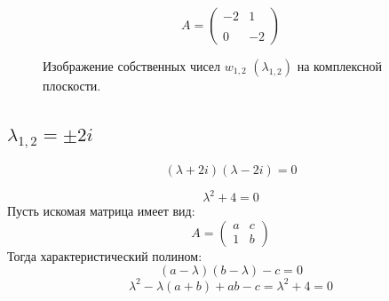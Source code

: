 \documentclass[a5paper, 10pt]{article}
\theoremstyle{definition}
\theoremstyle{plain}
\theoremstyle{remark}
\begin{document}
\begin{equation}
A =
\begin{pmatrix}
 -2 &  1\\
\\
0 &  -2
\end{pmatrix}
\end{equation}
\begin{figure}[h!]
\caption{Изображение собственных чисел $w_{1, 2} \, \, \left( \lambda_{1, 2} \right)$ на комплексной плоскости.}
\end{figure}


\subsection{$\lambda_{1, 2} = \pm 2i$}

\begin{equation}
\left( \lambda +  2i \right)\left( \lambda - 2i \right)=0
\end{equation}

\begin{equation}
\lambda^2 +  4 =0
\end{equation}
Пусть искомая матрица имеет вид:
\begin{equation}
A =
\begin{pmatrix}
a & c \\
1 & b
\end{pmatrix}
\end{equation}
Тогда характеристический полином:
\begin{equation}
\left( a - \lambda \right) \left( b - \lambda \right) - c = 0
\end{equation}
\begin{equation}
\lambda^ 2 - \lambda (a + b ) + ab - c =\lambda^2 +  4 =0
\end{equation}
\end{document}
